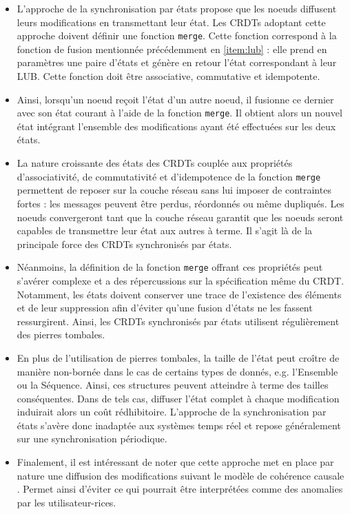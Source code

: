 \documentclass[12pt]{thesul}
\newcommand{\eg}{e.g. }
\begin{document}
\begin{itemize}
  \item L'approche de la synchronisation par états propose que les noeuds diffusent leurs modifications en transmettant leur état.
    Les \acp{CRDT} adoptant cette approche doivent définir une fonction \texttt{merge}.
    Cette fonction correspond à la fonction de fusion mentionnée précédemment en \ref{item:lub} : elle prend en paramètres une paire d'états et génère en retour l'état correspondant à leur \ac{LUB}.
    Cette fonction doit être associative, commutative et idempotente.
  \item Ainsi, lorsqu'un noeud reçoit l'état d'un autre noeud, il fusionne ce dernier avec son état courant à l'aide de la fonction \texttt{merge}.
    Il obtient alors un nouvel état intégrant l'ensemble des modifications ayant été effectuées sur les deux états.
  \item La nature croissante des états des \acp{CRDT} couplée aux propriétés d'associativité, de commutativité et d'idempotence de la fonction \texttt{merge} permettent de reposer sur la couche réseau sans lui imposer de contraintes fortes : les messages peuvent être perdus, réordonnés ou même dupliqués.
    Les noeuds convergeront tant que la couche réseau garantit que les noeuds seront capables de transmettre leur état aux autres à terme.
    Il s'agit là de la principale force des \acp{CRDT} synchronisés par états.
  \item Néanmoins, la définition de la fonction \texttt{merge} offrant ces propriétés peut s'avérer complexe et a des répercussions sur la spécification même du \ac{CRDT}.
    Notamment, les états doivent conserver une trace de l'existence des éléments et de leur suppression afin d'éviter qu'une fusion d'états ne les fassent ressurgirent.
    Ainsi, les \acp{CRDT} synchronisés par états utilisent régulièrement des pierres tombales.
  \item En plus de l'utilisation de pierres tombales, la taille de l'état peut croître de manière non-bornée dans le cas de certains types de donnés, \eg l'Ensemble ou la Séquence.
    Ainsi, ces structures peuvent atteindre à terme des tailles conséquentes.
    Dans de tels cas, diffuser l'état complet à chaque modification induirait alors un coût rédhibitoire.
    L'approche de la synchronisation par états s'avère donc inadaptée aux systèmes temps réel et repose généralement sur une synchronisation périodique.
  \item Finalement, il est intéressant de noter que cette approche met en place par nature une diffusion des modifications suivant le modèle de cohérence causale .
    Permet ainsi d'éviter ce qui pourrait être interprétées comme des anomalies par les utilisateur-rices.
\end{itemize}
\end{document}
